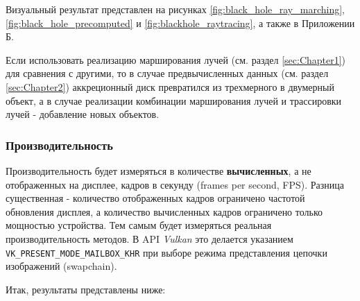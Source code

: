 Визуальный результат представлен на рисунках \ref{fig:black_hole_ray_marching}, \ref{fig:black_hole_precomputed} и \ref{fig:blackhole_raytracing}, а также в Приложении Б.

Если использовать реализацию марширования лучей (см. раздел \ref{sec:Chapter1}) для сравнения с другими, то в случае предвычисленных данных (см. раздел \ref{sec:Chapter2}) аккреционный диск превратился из трехмерного в двумерный объект, а в случае реализации комбинации марширования лучей и трассировки лучей - добавление новых объектов.

\subsubsection{Производительность}

Производительность будет измеряться в количестве \textbf{вычисленных}, а не отображенных на дисплее, кадров в секунду (frames per second, FPS). Разница существенная - количество отображенных кадров ограничено частотой обновления дисплея, а количество вычисленных кадров ограничено только мощностью устройства. Тем самым будет измеряться реальная производительность методов. В API \textit{Vulkan} это делается указанием \verb|VK_PRESENT_MODE_MAILBOX_KHR| при выборе режима представления цепочки изображений (swapchain).

Итак, результаты представлены ниже:

